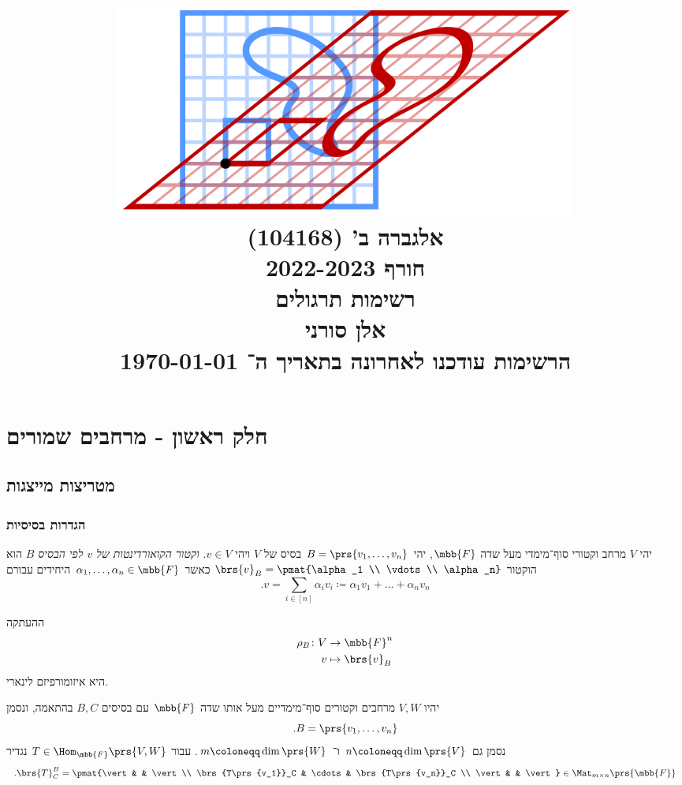 \documentclass[a4paper,10pt,twoside,openany]{book}
\title{
\includegraphics[width=6in]{images/front.png}\\
\vspace{30pt}
\Huge
אלגברה ב' (104168)
\\
חורף 2022-2023
\\
רשימות תרגולים
\vspace{30pt}
\\
\huge
אלן סורני
\vspace{30pt}
\\
\Large
הרשימות עודכנו לאחרונה בתאריך ה־%
\today
}
\date{}
\begin{document}
\frontmatter
\maketitle
\tableofcontents

\mainmatter

\part{חלק ראשון - מרחבים שמורים}

\chapter{מטריצות מייצגות}

\section{הגדרות בסיסיות}

\begin{definition}
יהי
$V$
מרחב וקטורי סוף־מימדי מעל שדה
$\mbb{F}$,
יהי
$B = \prs{v_1, \ldots, v_n}$
בסיס של
$V$
ויהי
$v \in V$.
\emph{וקטור הקואורדינטות של
$v$
לפי הבסיס
$B$}
הוא הוקטור
$\brs{v}_B = \pmat{\alpha_1 \\ \vdots \\ \alpha_n}$
כאשר
$\alpha_1, \ldots, \alpha_n \in \mbb{F}$
היחידים עבורם
\[\text{.}v = \sum_{i \in [n]} \alpha_i v_i \coloneqq \alpha_1 v_1 + \ldots + \alpha_n v_n\]
\end{definition}

\begin{remark}
ההעתקה
\begin{align*}
\rho_B \colon V &\to \mbb{F}^n \\
v &\mapsto \brs{v}_B
\end{align*}
היא איזומורפיזם לינארי.
\end{remark}

\begin{definition}
יהיו
$V,W$
מרחבים וקטורים סוף־מימדיים מעל אותו שדה
$\mbb{F}$
עם בסיסים
$B,C$
בהתאמה, ונסמן
\[\text{.} B = \prs{v_1, \ldots, v_n}\]
נסמן גם
$n \coloneqq \dim\prs{V}$
ו־%
$m \coloneqq \dim\prs{W}$.
עבור
$T \in \Hom_{\mbb{F}}\prs{V,W}$
נגדיר
\[\text{.} \brs{T}^B_C = \pmat{\vert & & \vert \\ \brs{T\prs{v_1}}_C & \cdots & \brs{T\prs{v_n}}_C \\ \vert & & \vert} \in \Mat_{m \times n}\prs{\mbb{F}}\]
\end{definition}
\end{document}
